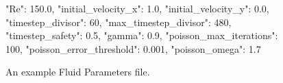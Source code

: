 \begin{figure}[ht]
    \centering
    \begin{jsoncode}
{
    "Re": 150.0,
    "initial_velocity_x": 1.0,
    "initial_velocity_y": 0.0,
    "timestep_divisor": 60,
    "max_timestep_divisor": 480,
    "timestep_safety": 0.5,
    "gamma": 0.9,
    "poisson_max_iterations": 100,
    "poisson_error_threshold": 0.001,
    "poisson_omega": 1.7
}
\end{jsoncode}
    \caption{An example Fluid Parameters file.}
    \label{fig:FluidParamsExample}
\end{figure}